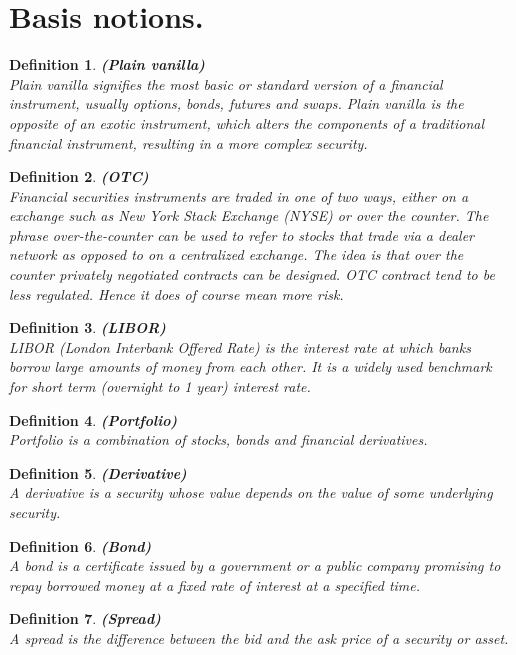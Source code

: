 \documentclass{book}
\newtheorem{definition}{Definition}[section]
\begin{document}
\section{Basis notions.}
\begin{definition}\textbf{(Plain vanilla)}\\
Plain vanilla signifies the most basic or standard version of a financial instrument, usually options, bonds, futures and swaps. Plain vanilla is the opposite of an exotic instrument, which alters the components of a traditional financial instrument, resulting in a more complex security.
\end{definition}
\begin{definition}\textbf{(OTC)}\\
Financial securities instruments are traded in one of two ways, either on a exchange such as New York Stack Exchange (NYSE) or over the counter.  
The phrase over-the-counter can be used to refer to stocks that trade via a dealer network as opposed to on a centralized exchange. The idea is that over the counter privately negotiated contracts can be designed. OTC contract tend to be less regulated. Hence it does of course mean more risk.
\end{definition}
\begin{definition}\textbf{(LIBOR)}\\
LIBOR (London Interbank Offered Rate) is the interest rate at which banks borrow large amounts of money from each other. It is a widely used benchmark for short term (overnight to 1 year) interest rate.  
\end{definition}
\begin{definition}\textbf{(Portfolio)}\\
Portfolio is a combination of stocks, bonds and financial derivatives.
\end{definition}
\begin{definition}\textbf{(Derivative)}\\
A derivative is a security whose value depends on the value of some underlying security.
\end{definition}
\begin{definition}\textbf{(Bond)}\\
A bond is a certificate issued by a government or a public company promising to repay
borrowed money at a fixed rate of interest at a specified time.
\end{definition}
\begin{definition}\textbf{(Spread)}\\
A spread is the difference between the bid and the ask price of a security or asset.
\end{definition}
\end{document}

